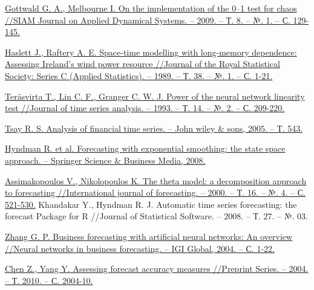 \documentclass[a4paper,12pt]{article}
\begin{document}
\begin{thebibliography}{99}
	\href{https://arxiv.org/pdf/0906.1418.pdf}{Gottwald G. A., Melbourne I. On the implementation of the 0–1 test for chaos //SIAM Journal on Applied Dynamical Systems. – 2009. – Т. 8. – №. 1. – С. 129-145.}
	
	\href{https://www.jstor.org/stable/pdf/2347679.pdf?casa_token=IHbWtz1Mt3gAAAAA:jzPs29XzT4MV4R1rqL1SgF7RP1QdIKFJLluogM-LmyhQrOFTf2zv6_gz-rvOdTORp5FVU7x-3tTxAOqs6PXgSwEGFRsOcW7dHP8AEKxDVq16_ywZJ4YS}{Haslett J., Raftery A. E. Space‐time modelling with long‐memory dependence: Assessing Ireland's wind power resource //Journal of the Royal Statistical Society: Series C (Applied Statistics). – 1989. – Т. 38. – №. 1. – С. 1-21.}
	
	\href{https://onlinelibrary.wiley.com/doi/pdf/10.1111/j.1467-9892.1993.tb00139.x?casa_token=VTgIjr6WkKwAAAAA:INpZkev855M5upMdwOsxh7gSAU0ZRRItxCqwtTFNg7Dn5LVV-RrrWZ9f4Ob3ECcnRytZOLM1vElakl93}{Teräsvirta T., Lin C. F., Granger C. W. J. Power of the neural network linearity test //Journal of time series analysis. – 1993. – Т. 14. – №. 2. – С. 209-220.}

	\href{http://citeseerx.ist.psu.edu/viewdoc/download?doi=10.1.1.665.8479&rep=rep1&type=pdf}{Tsay R. S. Analysis of financial time series. – John wiley \& sons, 2005. – Т. 543.}
	
	\href{https://books.google.ru/books?hl=ru&lr=&id=GSyzox8Lu9YC&oi=fnd&pg=PA2&ots=1q8pJKrEn6&sig=tZEeP-DbxVTkxZ-EfNVDQ9njYWs&redir_esc=y#v=onepage&q&f=false}{Hyndman R. et al. Forecasting with exponential smoothing: the state space approach. – Springer Science \& Business Media, 2008.}
	
	\href{https://www.researchgate.net/profile/Vassilis_Assimakopoulos/publication/223049702_The_theta_model_A_decomposition_approach_to_forecasting/links/5a7e3b2daca272a73765ccf8/The-theta-model-A-decomposition-approach-to-forecasting.pdf}{Assimakopoulos V., Nikolopoulos K. The theta model: a decomposition approach to forecasting //International journal of forecasting. – 2000. – Т. 16. – №. 4. – С. 521-530.}
	Khandakar Y., Hyndman R. J. Automatic time series forecasting: the forecast Package for R //Journal of Statistical Software. – 2008. – Т. 27. – №. 03.
	
	\href{http://citeseerx.ist.psu.edu/viewdoc/download?doi=10.1.1.115.140&rep=rep1&type=pdf}{Zhang G. P. Business forecasting with artificial neural networks: An overview //Neural networks in business forecasting. – IGI Global, 2004. – С. 1-22.}
	
	\href{https://pdfs.semanticscholar.org/385c/dea69e2c0f8a39e9f8420b326f91a9e7019f.pdf}{Chen Z., Yang Y. Assessing forecast accuracy measures //Preprint Series. – 2004. – Т. 2010. – С. 2004-10. 	}
\end{thebibliography}
\end{document}
